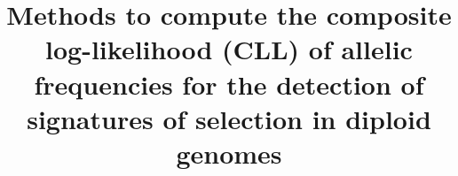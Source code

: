 \documentclass{bmcart}
\begin{document}
\begin{frontmatter}

\begin{fmbox}


\title{Methods to compute the composite log-likelihood (CLL) of allelic
  frequencies for the detection of
  signatures of selection in diploid genomes}


\author[
   addressref={aff1},                   %
   corref={aff1},                       %
   email={filippo.biscarini@tecnoparco.org}   %
]{ }
\author[
   addressref={aff1}, 
   email={john.RS.Smith@cambridge.co.uk}
]{ }
\author[
   addressref={aff1}, 
   email={john.RS.Smith@cambridge.co.uk}
]{ }


\address[id=aff1]{%
  , %
  ,                     %
  ,                              %
}


\end{fmbox}
\end{frontmatter}
\end{document}
